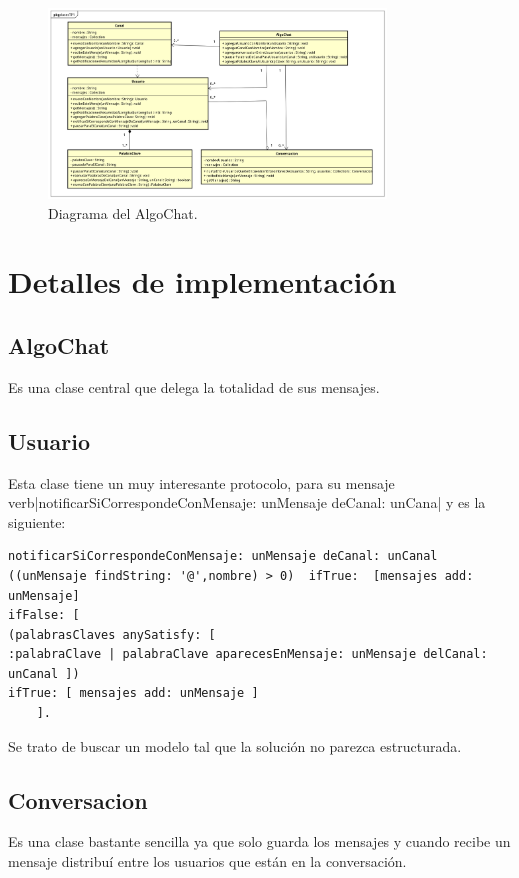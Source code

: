 \documentclass[titlepage,a4paper]{article}
\begin{document}
\begin{figure}[H]
\centering
\includegraphics[width=0.8\textwidth]{DiagramaDeClases/DiagramaDeClasesTP1.png}
\caption{\label{fig:class01}Diagrama del AlgoChat.}
\end{figure}

\section{Detalles de implementación}\label{sec:implementacion}

\subsection{AlgoChat}Es una clase central que delega la totalidad de sus mensajes.

\subsection{Usuario} Esta clase tiene un muy interesante protocolo, para su mensaje \\verb|notificarSiCorrespondeConMensaje: unMensaje deCanal: unCana| y es la siguiente:
\begin{verbatim}
notificarSiCorrespondeConMensaje: unMensaje deCanal: unCanal
((unMensaje findString: '@',nombre) > 0)  ifTrue:  [mensajes add: unMensaje] 
ifFalse: [
(palabrasClaves anySatisfy: [ 
:palabraClave | palabraClave aparecesEnMensaje: unMensaje delCanal: unCanal ]) 
ifTrue: [ mensajes add: unMensaje ] 
	]. 
\end{verbatim}
Se trato de buscar un modelo tal que la solución no parezca estructurada.
\subsection{Conversacion} Es una clase bastante sencilla ya que solo guarda los mensajes y cuando recibe un mensaje distribuí entre los usuarios que están en la conversación.
\end{document}
